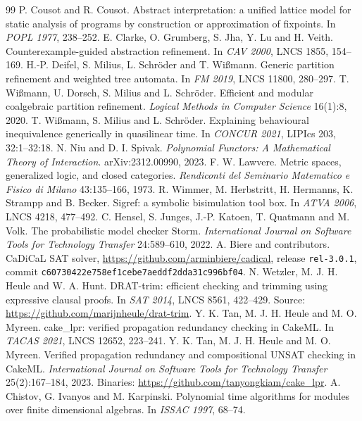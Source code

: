 \documentclass[11pt]{article}
\newcommand{\code}[1]{\texttt{#1}}
\theoremstyle{definition}
\theoremstyle{plain}
\begin{document}
\begin{thebibliography}{99}
 P. Cousot and R. Cousot. Abstract interpretation: a unified lattice model for static analysis of programs by construction or approximation of fixpoints. In \emph{POPL 1977}, 238--252.
 E. Clarke, O. Grumberg, S. Jha, Y. Lu and H. Veith. Counterexample-guided abstraction refinement. In \emph{CAV 2000}, LNCS 1855, 154--169.
 H.-P. Deifel, S. Milius, L. Schr\"oder and T. Wi\ss{}mann. Generic partition refinement and weighted tree automata. In \emph{FM 2019}, LNCS 11800, 280--297.
 T. Wi\ss{}mann, U. Dorsch, S. Milius and L. Schr\"oder. Efficient and modular coalgebraic partition refinement. \emph{Logical Methods in Computer Science} 16(1):8, 2020.
 T. Wi\ss{}mann, S. Milius and L. Schr\"oder. Explaining behavioural inequivalence generically in quasilinear time. In \emph{CONCUR 2021}, LIPIcs 203, 32:1--32:18.
 N. Niu and D. I. Spivak. \emph{Polynomial Functors: A Mathematical Theory of Interaction}. arXiv:2312.00990, 2023.
 F. W. Lawvere. Metric spaces, generalized logic, and closed categories. \emph{Rendiconti del Seminario Matematico e Fisico di Milano} 43:135--166, 1973.
 R. Wimmer, M. Herbstritt, H. Hermanns, K. Strampp and B. Becker. Sigref: a symbolic bisimulation tool box. In \emph{ATVA 2006}, LNCS 4218, 477--492.
 C. Hensel, S. Junges, J.-P. Katoen, T. Quatmann and M. Volk. The probabilistic model checker Storm. \emph{International Journal on Software Tools for Technology Transfer} 24:589--610, 2022.
 A. Biere and contributors. CaDiCaL SAT solver, \url{https://github.com/arminbiere/cadical}, release \code{rel-3.0.1}, commit \code{c60730422e758ef1cebe7aeddf2dda31c996bf04}.
 N. Wetzler, M. J. H. Heule and W. A. Hunt. DRAT-trim: efficient checking and trimming using expressive clausal proofs. In \emph{SAT 2014}, LNCS 8561, 422--429. Source: \url{https://github.com/marijnheule/drat-trim}.
 Y. K. Tan, M. J. H. Heule and M. O. Myreen. cake\_lpr: verified propagation redundancy checking in CakeML. In \emph{TACAS 2021}, LNCS 12652, 223--241.
 Y. K. Tan, M. J. H. Heule and M. O. Myreen. Verified propagation redundancy and compositional UNSAT checking in CakeML. \emph{International Journal on Software Tools for Technology Transfer} 25(2):167--184, 2023. Binaries: \url{https://github.com/tanyongkiam/cake_lpr}.
 A. Chistov, G. Ivanyos and M. Karpinski. Polynomial time algorithms for modules over finite dimensional algebras. In \emph{ISSAC 1997}, 68--74.

\end{thebibliography}
\end{document}
